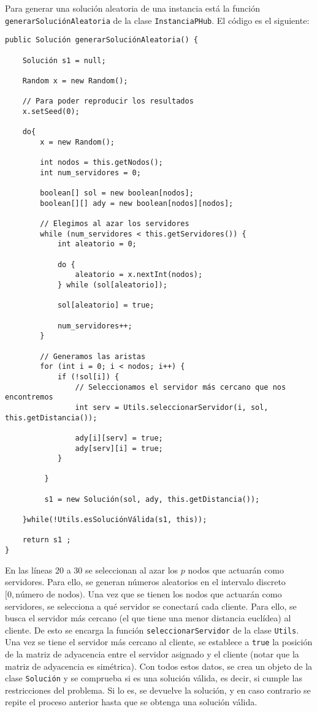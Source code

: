 \documentclass[11pt,a4paper,twoside,openright,titlepage,final]{article}
\begin{document}
Para generar una solución aleatoria de una instancia está la función \texttt{generarSoluciónAleatoria} de la clase \texttt{InstanciaPHub}. El código es el siguiente:

\begin{verbatim}
public Solución generarSoluciónAleatoria() {

    Solución s1 = null;

    Random x = new Random();

    // Para poder reproducir los resultados
    x.setSeed(0);

    do{
        x = new Random();

        int nodos = this.getNodos();
        int num_servidores = 0;

        boolean[] sol = new boolean[nodos];
        boolean[][] ady = new boolean[nodos][nodos];

        // Elegimos al azar los servidores
        while (num_servidores < this.getServidores()) {
            int aleatorio = 0;
        
            do {
                aleatorio = x.nextInt(nodos);
            } while (sol[aleatorio]);

            sol[aleatorio] = true;

            num_servidores++;
        }

        // Generamos las aristas
        for (int i = 0; i < nodos; i++) {
            if (!sol[i]) {
                // Seleccionamos el servidor más cercano que nos encontremos
                int serv = Utils.seleccionarServidor(i, sol, this.getDistancia());

                ady[i][serv] = true;
                ady[serv][i] = true;
            }

         }

         s1 = new Solución(sol, ady, this.getDistancia());

    }while(!Utils.esSoluciónVálida(s1, this));

    return s1 ;
}
\end{verbatim}

En las líneas 20 a 30 se seleccionan al azar los $p$ nodos que actuarán como servidores. Para ello, se generan números aleatorios en el intervalo discreto $[0, \text{número de nodos})$. Una vez que se tienen los nodos que actuarán como servidores, se selecciona a qué servidor se conectará cada cliente. Para ello, se busca el servidor más cercano (el que tiene una menor distancia euclídea) al cliente. De esto se encarga la función \texttt{seleccionarServidor} de la clase \texttt{Utils}. Una vez se tiene el servidor más cercano al cliente, se establece a \texttt{true} la posición de la matriz de adyacencia entre el servidor asignado y el cliente (notar que la matriz de adyacencia es simétrica). Con todos estos datos, se crea un objeto de la clase \texttt{Solución} y se comprueba si es una solución válida, es decir, si cumple las restricciones del problema. Si lo es, se devuelve la solución, y en caso contrario se repite el proceso anterior hasta que se obtenga una solución válida.\\
\end{document}
